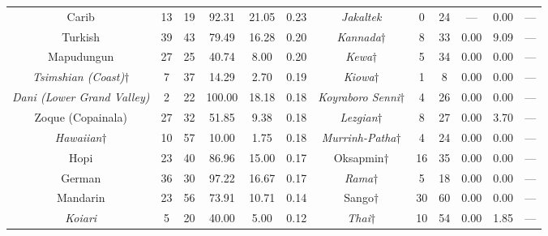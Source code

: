 \begin{tabular}{cccccccccccc}
Carib & 13 & 19 & 92.31 & 21.05 & 0.23 & \emph{Jakaltek} & 0 & 24 & --- & 0.00 & --- \\
Turkish & 39 & 43 & 79.49 & 16.28 & 0.20 & \emph{Kannada}$\dagger$ & 8 & 33 & 0.00 & 9.09 & --- \\
Mapudungun & 27 & 25 & 40.74 & 8.00 & 0.20 & \emph{Kewa}$\dagger$ & 5 & 34 & 0.00 & 0.00 & --- \\
\emph{Tsimshian (Coast)}$\dagger$ & 7 & 37 & 14.29 & 2.70 & 0.19 & \emph{Kiowa}$\dagger$ & 1 & 8 & 0.00 & 0.00 & --- \\
\emph{Dani (Lower Grand Valley)} & 2 & 22 & 100.00 & 18.18 & 0.18 & \emph{Koyraboro Senni}$\dagger$ & 4 & 26 & 0.00 & 0.00 & --- \\
Zoque (Copainala) & 27 & 32 & 51.85 & 9.38 & 0.18 & \emph{Lezgian}$\dagger$ & 8 & 27 & 0.00 & 3.70 & --- \\
\emph{Hawaiian}$\dagger$ & 10 & 57 & 10.00 & 1.75 & 0.18 & \emph{Murrinh-Patha}$\dagger$ & 4 & 24 & 0.00 & 0.00 & --- \\
Hopi & 23 & 40 & 86.96 & 15.00 & 0.17 & Oksapmin$\dagger$ & 16 & 35 & 0.00 & 0.00 & --- \\
German & 36 & 30 & 97.22 & 16.67 & 0.17 & \emph{Rama}$\dagger$ & 5 & 18 & 0.00 & 0.00 & --- \\
Mandarin & 23 & 56 & 73.91 & 10.71 & 0.14 & Sango$\dagger$ & 30 & 60 & 0.00 & 0.00 & --- \\
\emph{Koiari} & 5 & 20 & 40.00 & 5.00 & 0.12 & \emph{Thai}$\dagger$ & 10 & 54 & 0.00 & 1.85 & ---
\end{tabular}